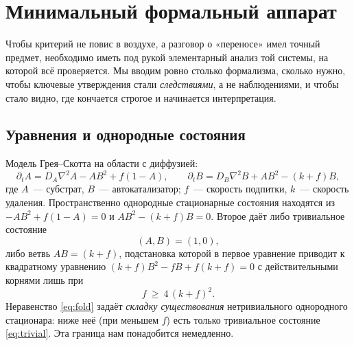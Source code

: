 \documentclass[11pt]{article}
\newcommand{\DA}{D_{\!A}}\newcommand{\DB}{D_{\!B}}
\begin{document}
\section{Минимальный формальный аппарат}
Чтобы критерий не повис в воздухе, а разговор о «переносе» имел точный предмет, необходимо иметь под рукой
элементарный анализ той системы, на которой всё проверяется. Мы вводим ровно столько формализма, сколько нужно,
чтобы ключевые утверждения стали \emph{следствиями}, а не наблюдениями, и чтобы стало видно, где кончается
строгое и начинается интерпретация.

\subsection{Уравнения и однородные состояния}
Модель Грея–Скотта \cite{gray1984,pearson1993} на области с диффузией:
\begin{equation}
\partial_t A=\DA\nabla^2 A-AB^2+f(1-A),\qquad
\partial_t B=\DB\nabla^2 B+AB^2-(k+f)B ,
\label{eq:gs}
\end{equation}
где $A$~— субстрат, $B$~— автокатализатор; $f$~— скорость подпитки, $k$~— скорость удаления. Пространственно
однородные стационарные состояния находятся из $-AB^2+f(1-A)=0$ и $AB^2-(k+f)B=0$. Второе даёт либо тривиальное
состояние
\begin{equation}
(A,B)=(1,0),
\label{eq:trivial}
\end{equation}
либо ветвь $AB=(k+f)$, подстановка которой в первое уравнение приводит к квадратному уравнению
$(k+f)B^2-fB+f(k+f)=0$ с действительными корнями лишь при
\begin{equation}
f\ \ge\ 4\,(k+f)^2 .
\label{eq:fold}
\end{equation}
Неравенство \eqref{eq:fold} задаёт \emph{складку существования} нетривиального однородного стационара: ниже неё
(при меньшем $f$) есть только тривиальное состояние \eqref{eq:trivial}. Эта граница нам понадобится немедленно.
\end{document}
